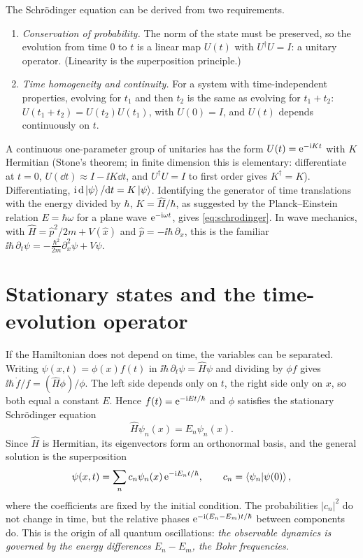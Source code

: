 \begin{origin}
The Schrödinger equation can be derived from two requirements.
\begin{enumerate}
  \item \emph{Conservation of probability.} The norm of the state must be preserved, so the evolution from time $0$ to $t$
  is a linear map $U(t)$ with $U^\dagger U=I$: a unitary operator. (Linearity is the superposition principle.)
  \item \emph{Time homogeneity and continuity.} For a system with time-independent properties, evolving for $t_1$ and then $t_2$
  is the same as evolving for $t_1+t_2$: $U(t_1+t_2)=U(t_2)U(t_1)$, with $U(0)=I$, and $U(t)$ depends continuously on $t$.
\end{enumerate}
A continuous one-parameter group of unitaries has the form $U(t)=\mathrm e^{-\mathrm i Kt}$ with $K$ Hermitian (Stone's theorem; in finite
dimension this is elementary: differentiate at $t=0$, $U(\dd t)\approx I-\ii K\dd t$, and $U^\dagger U=I$ to first order gives $K^\dagger=K$).
Differentiating, $\mathrm i\,\mathrm d\left|\psi\right\rangle/\mathrm d t=K\left|\psi\right\rangle$. Identifying the generator of time translations with the energy divided by $\hbar$,
$K=\hat H/\hbar$, as suggested by the Planck--Einstein relation $E=\hbar\omega$ for a plane wave $\mathrm e^{-\mathrm i\omega t}$, gives
\cref{eq:schrodinger}. In wave mechanics, with $\hat H=\hat p^2/2m+V(\hat x)$ and $\hat p=-\ii\hbar\,\partial_x$, this is the
familiar $\ii\hbar\,\partial_t\psi=-\frac{\hbar^2}{2m}\partial_x^2\psi+V\psi$.
\end{origin}

\section{Stationary states and the time-evolution operator}
If the Hamiltonian does not depend on time, the variables can be separated. Writing $\psi(x,t)=\phi(x)f(t)$ in
$\ii\hbar\,\partial_t\psi=\hat H\psi$ and dividing by $\phi f$ gives $\ii\hbar\,\dot f/f=(\hat H\phi)/\phi$. The left side depends only
on $t$, the right side only on $x$, so both equal a constant $E$. Hence $f(t)=\mathrm e^{-\mathrm i Et/\hbar}$ and $\phi$ satisfies the stationary
Schrödinger equation
\begin{equation}\label{eq:stationary}
  \hat H\psi_n(x)=E_n\psi_n(x).
\end{equation}
Since $\hat H$ is Hermitian, its eigenvectors form an orthonormal basis, and the general solution is the superposition
\begin{equation}\label{eq:superposition}
  \psi(x,t)=\sum_n c_n\psi_n(x)\,\mathrm e^{-\mathrm i E_nt/\hbar},\qquad c_n=\left\langle\psi_n\middle|\psi(0)\right\rangle,
\end{equation}
where the coefficients are fixed by the initial condition. The probabilities $|c_n|^2$ do not change in time, but the relative
phases $\mathrm e^{-\mathrm i(E_n-E_m)t/\hbar}$ between components do. This is the origin of all quantum oscillations: \emph{the observable dynamics
is governed by the energy differences $E_n-E_m$, the Bohr frequencies.}

